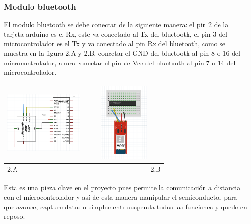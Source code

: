 \documentclass[12]{article}
\newenvironment{Figure}
{\par\medskip\noindent\minipage{\linewidth}}
{\endminipage\par\medskip}
\begin{document}
\begin{multicols}{2}
\subsubsection{Modulo bluetooth}
El modulo bluetooth se debe conectar de la siguiente manera: el pin 2 de la tarjeta arduino es el Rx, este va conectado al Tx del bluetooth, el pin 3 del microcontrolador es el Tx y va conectado al pin Rx del bluetooth, como se muestra en la figura 2.A y 2.B, conectar el GND del bluetooth al pin 8  o 16 del microcontrolador, ahora conectar el pin de Vcc del bluetooth al pin 7 o 14 del microcontrolador.
\begin{Figure}
\center
\begin{tabular}{|l|r|}
\hline
\includegraphics[width=4cm, height=4cm]{img/bluetoothesq.png} & \includegraphics[width=4cm, height=4cm]{img/bluetoothmon.png} \\ \hline
2.A & 2.B \\ \hline
\end{tabular}
\label{fig:g2}
\end{Figure}
Esta es una pieza clave en el proyecto pues permite la comunicación a distancia con el microcontrolador y así de esta manera manipular el semiconductor para que avance, capture datos o simplemente suspenda todas las funciones y quede en reposo.

\end{multicols}
\end{document}
